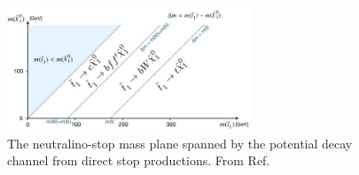 \begin{figure}[ht!]
  \begin{center}
      \includegraphics[width=0.65\textwidth,]{figures/mstop_mLSP_plane.jpg}
      \caption{The neutralino-stop mass plane spanned by the potential decay channel from 
      direct stop productions. From Ref.~\cite{cms-susy}}
    \label{fig:mStop_mLsp}
  \end{center}
\end{figure}
